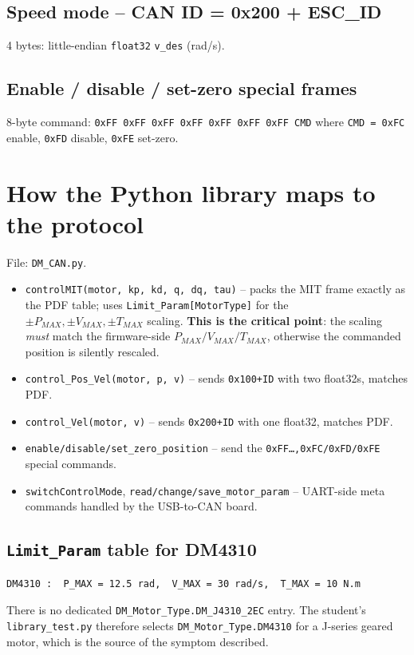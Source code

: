 \documentclass[11pt,a4paper]{article}
\begin{document}
\subsection{Speed mode -- CAN ID = 0x200 + ESC\_ID}
4 bytes: little-endian \texttt{float32} \texttt{v\_des} (rad/s).

\subsection{Enable / disable / set-zero special frames}
8-byte command: \texttt{0xFF 0xFF 0xFF 0xFF 0xFF 0xFF 0xFF CMD}
where \texttt{CMD = 0xFC} enable, \texttt{0xFD} disable, \texttt{0xFE} set-zero.

\section{How the Python library maps to the protocol}
File: \texttt{DM\_CAN.py}.
\begin{itemize}
  \item \texttt{controlMIT(motor, kp, kd, q, dq, tau)} -- packs the MIT frame
        exactly as the PDF table; uses \texttt{Limit\_Param[MotorType]} for the
        $\pm P_{MAX}, \pm V_{MAX}, \pm T_{MAX}$ scaling. \textbf{This is the
        critical point}: the scaling \emph{must} match the firmware-side
        $P_{MAX}/V_{MAX}/T_{MAX}$, otherwise the commanded position is silently
        rescaled.
  \item \texttt{control\_Pos\_Vel(motor, p, v)} -- sends \texttt{0x100+ID} with
        two float32s, matches PDF.
  \item \texttt{control\_Vel(motor, v)} -- sends \texttt{0x200+ID} with one
        float32, matches PDF.
  \item \texttt{enable/disable/set\_zero\_position} -- send the
        \texttt{0xFF\dots,0xFC/0xFD/0xFE} special commands.
  \item \texttt{switchControlMode}, \texttt{read/change/save\_motor\_param} --
        UART-side meta commands handled by the USB-to-CAN board.
\end{itemize}

\subsection{\texttt{Limit\_Param} table for DM4310}
\begin{verbatim}
DM4310 :  P_MAX = 12.5 rad,  V_MAX = 30 rad/s,  T_MAX = 10 N.m
\end{verbatim}
There is no dedicated \texttt{DM\_Motor\_Type.DM\_J4310\_2EC} entry. The student's
\texttt{library\_test.py} therefore selects \texttt{DM\_Motor\_Type.DM4310} for a
J-series geared motor, which is the source of the symptom described.
\end{document}
